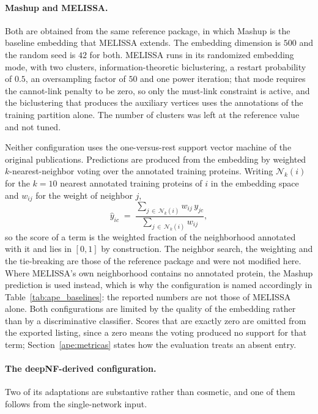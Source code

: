 \documentclass[Ingles]{ic-tese-v3}
\begin{document}
\begin{appendices}{}
\paragraph{Mashup and MELISSA.} Both are obtained from the same reference package, in which Mashup is
the baseline embedding that MELISSA extends. The embedding dimension is $500$ and the random seed is
$42$ for both. MELISSA runs in its randomized embedding mode, with two clusters, information-theoretic
biclustering, a restart probability of $0.5$, an oversampling factor of $50$ and one power iteration;
that mode requires the cannot-link penalty to be zero, so only the must-link constraint is active,
and the biclustering that produces the auxiliary vertices uses the annotations of the training
partition alone. The number of clusters was left at the reference value and not tuned.

Neither configuration uses the one-versus-rest support vector machine of the original publications.
Predictions are produced from the embedding by weighted $k$-nearest-neighbor voting over the
annotated training proteins. Writing $\mathcal{N}_k(i)$ for the $k = 10$ nearest annotated training
proteins of $i$ in the embedding space and $w_{ij}$ for the weight of neighbor $j$,
\begin{equation}
  \hat{y}_{ic} \;=\;
  \frac{\displaystyle\sum_{j \,\in\, \mathcal{N}_k(i)} w_{ij}\, y_{jc}}
       {\displaystyle\sum_{j \,\in\, \mathcal{N}_k(i)} w_{ij}},
  \label{eq:ape_knn}
\end{equation}
so the score of a term is the weighted fraction of the neighborhood annotated with it and lies in
$[0,1]$ by construction. The neighbor search, the weighting and the tie-breaking are those of the
reference package and were not modified here. Where MELISSA's own neighborhood contains no annotated
protein, the Mashup prediction is used instead, which is why the configuration is named accordingly
in Table~\ref{tab:ape_baselines}: the reported numbers are not those of MELISSA alone. Both
configurations are limited by the quality of the embedding rather than by a discriminative
classifier. Scores that are exactly zero are omitted from the exported listing, since a zero means
the voting produced no support for that term; Section~\ref{ape:metricas} states how the evaluation
treats an absent entry.

\paragraph{The deepNF-derived configuration.} Two of its adaptations are substantive rather than
cosmetic, and one of them follows from the single-network input.


\end{appendices}
\end{document}

